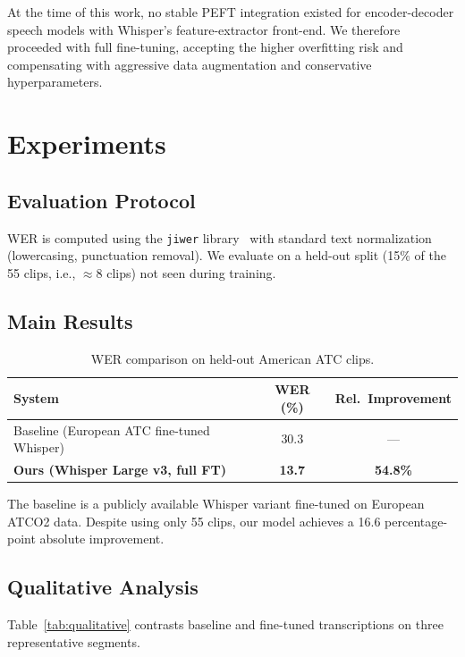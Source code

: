 \documentclass[11pt,a4paper]{article}
\begin{document}
At the time of this work, no stable PEFT integration existed for
encoder-decoder speech models with Whisper's feature-extractor front-end.
We therefore proceeded with full fine-tuning, accepting the higher overfitting
risk and compensating with aggressive data augmentation and conservative
hyperparameters.

\section{Experiments}
\label{sec:experiments}

\subsection{Evaluation Protocol}

WER is computed using the \texttt{jiwer} library~\cite{jiwer2023} with
standard text normalization (lowercasing, punctuation removal).
We evaluate on a held-out split (15\% of the 55 clips, i.e., $\approx$8 clips)
not seen during training.

\subsection{Main Results}

\begin{table}[h]
\centering
\caption{WER comparison on held-out American ATC clips.}
\begin{tabular}{lcc}
\toprule
\textbf{System} & \textbf{WER (\%)} & \textbf{Rel.\ Improvement} \\
\midrule
Baseline (European ATC fine-tuned Whisper) & 30.3 & --- \\
\textbf{Ours (Whisper Large v3, full FT)}  & \textbf{13.7} & \textbf{54.8\%} \\
\bottomrule
\end{tabular}
\label{tab:mainresults}
\end{table}

The baseline is a publicly available Whisper variant fine-tuned on European
ATCO2 data.
Despite using only 55 clips, our model achieves a 16.6 percentage-point
absolute improvement.

\subsection{Qualitative Analysis}

Table~\ref{tab:qualitative} contrasts baseline and fine-tuned transcriptions
on three representative segments.
\end{document}
